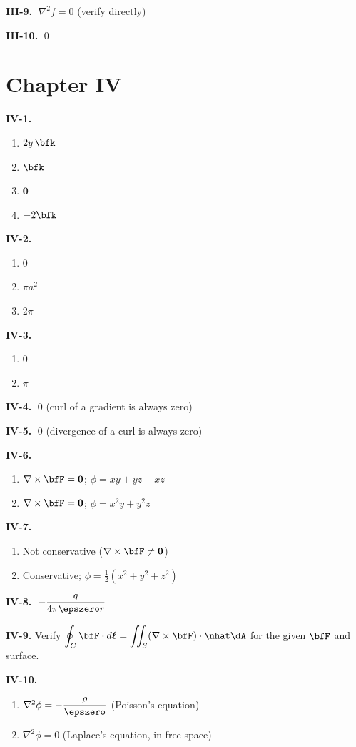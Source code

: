 \medskip
\textbf{III-9.} $\;\nabla^2 f = 0$ (verify directly)

\medskip
\textbf{III-10.} $\;0$

\section*{Chapter IV}

\textbf{IV-1.}
\begin{enumerate}[label=(\alph*)]
  \item $2y\,\bfk$
  \item $\bfk$
  \item $\mathbf{0}$
  \item $-2\bfk$
\end{enumerate}

\medskip
\textbf{IV-2.}
\begin{enumerate}[label=(\alph*)]
  \item $0$
  \item $\pi a^2$
  \item $2\pi$
\end{enumerate}

\medskip
\textbf{IV-3.}
\begin{enumerate}[label=(\alph*)]
  \item $0$
  \item $\pi$
\end{enumerate}

\medskip
\textbf{IV-4.} $\;0$ (curl of a gradient is always zero)

\medskip
\textbf{IV-5.} $\;0$ (divergence of a curl is always zero)

\medskip
\textbf{IV-6.}
\begin{enumerate}[label=(\alph*)]
  \item $\nabla\times\bfF = \mathbf{0}$; \quad $\phi = xy + yz + xz$
  \item $\nabla\times\bfF = \mathbf{0}$; \quad $\phi = x^2 y + y^2 z$
\end{enumerate}

\medskip
\textbf{IV-7.}
\begin{enumerate}[label=(\alph*)]
  \item Not conservative ($\nabla\times\bfF \neq \mathbf{0}$)
  \item Conservative; $\phi = \frac{1}{2}(x^2 + y^2 + z^2)$
\end{enumerate}

\medskip
\textbf{IV-8.} $\;-\dfrac{q}{4\pi\epszero r}$

\medskip
\textbf{IV-9.} Verify $\displaystyle\oint_C \bfF\cdot d\boldsymbol{\ell}
  = \iint_S (\nabla\times\bfF)\cdot\nhat\dA$ for the given $\bfF$ and surface.

\medskip
\textbf{IV-10.}
\begin{enumerate}[label=(\alph*)]
  \item $\nabla^2\phi = -\dfrac{\rho}{\epszero}$ (Poisson's equation)
  \item $\nabla^2\phi = 0$ (Laplace's equation, in free space)
\end{enumerate}
